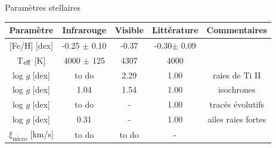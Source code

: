 \documentclass[10pt]{beamer}
\begin{document}
\begin{frame}[fragile]{Paramètres stellaires}
    \begin{table}[h!]
        \begin{center}
            \renewcommand{\arraystretch}{1.5}
            \begin{tabular}{c|ccc|c}
                Paramètre & Infrarouge &Visible& Littérature &Commentaires\\
                \hline
                
                $[$Fe/H$]$ [dex]& -0.25 $\pm$ 0.10 & -0.37 &
                -0.30$\pm$ 0.09&\\

                T$_{\rm eff}$ [K] & 4000 $\pm$ 125 &4307 & 4000& \\
    
                \rowcolor{gray!15} log $g$ [dex]& to do & 2.29 & 1.00&raies de Ti II\\
                log $g$ [dex] & 1.04 & 1.54 & 1.00 &isochrones\\
                \rowcolor{gray!15}log $g$ [dex] & to do & - & 1.00 &tracés évolutifs\\
                log $g$ [dex]& 0.31 &-& 1.00 &ailes raies fortes\\
                \rowcolor{gray!15} $\xi_{\text{micro}}$ [km/s]& to do & to do & - &\\
            \end{tabular}
        \end{center}
    \end{table}
    \end{frame}
\end{document}
